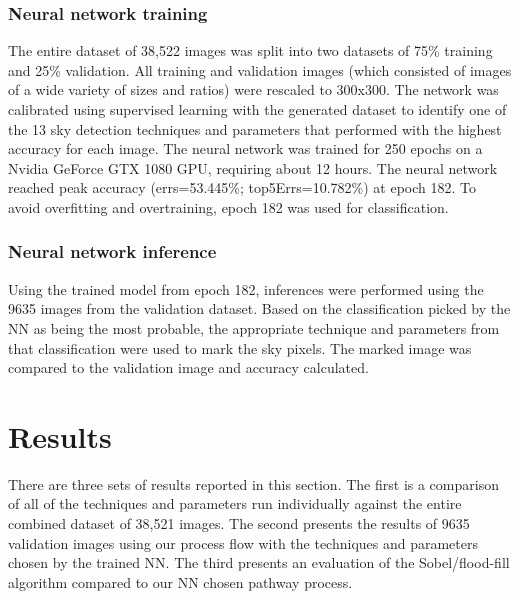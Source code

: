 \documentclass[final,3p,times,authoryear]{elsarticle}
\begin{document}
\subsubsection{Neural network training}\label{sec:nntraining}    

The entire dataset of 38,522 images was split into two datasets of 75\% training and 25\% validation. All training and validation images (which consisted of images of a wide variety of sizes and ratios) were rescaled to 300x300. The network was calibrated using supervised learning with the generated dataset to identify one of the 13 sky detection techniques and parameters that performed with the highest accuracy for each image. The neural network was trained for 250 epochs on a Nvidia GeForce GTX 1080 GPU, requiring about 12 hours. The neural network reached peak accuracy (errs=53.445\%; top5Errs=10.782\%) at epoch 182. To avoid overfitting and overtraining, epoch 182 was used for classification. 





\subsubsection{Neural network inference}\label{sec:nninference}    
Using the trained model from epoch 182, inferences were performed using the 9635 images from the validation dataset. Based on the classification picked by the NN as being the most probable, the appropriate technique and parameters from that classification were used to mark the sky pixels. The marked image was compared to the validation image and accuracy calculated.



\section{Results}\label{sec:results}


There are three sets of results reported in this section. The first is a comparison of all of the techniques and parameters run individually against the entire combined dataset of 38,521 images. The second presents the results of 9635  validation images using our process flow with the techniques and parameters chosen by the trained NN. The third presents an evaluation of the \cite{Middel2018} Sobel/flood-fill algorithm compared to our NN chosen pathway process.
\end{document}
